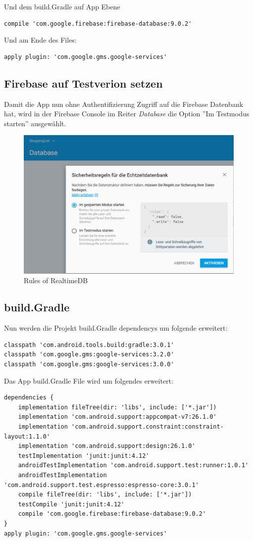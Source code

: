 Und dem build.Gradle auf App Ebene
\begin{lstlisting}
compile 'com.google.firebase:firebase-database:9.0.2'
\end{lstlisting}

Und am Ende des Files:
\begin{lstlisting}
apply plugin: 'com.google.gms.google-services'
\end{lstlisting}
\clearpage
\subsection{Firebase auf Testverion setzen}
Damit die App nun ohne Authentifizierung Zugriff auf die Firebase Datenbank hat, wird in der Firebase Console im Reiter \textit{Database} die Option ''Im Testmodus starten'' ausgewählt. 

\begin{figure}[!h]
	\centering
	\includegraphics[width=0.7\linewidth]{images/RealtimeDBrules}
	\caption{Rules of RealtimeDB}
	\label{fig:realtimedbrules}
\end{figure}

\subsection{build.Gradle}
Nun werden die Projekt build.Gradle dependencys um folgende erweitert:
\begin{lstlisting}
classpath 'com.android.tools.build:gradle:3.0.1'
classpath 'com.google.gms:google-services:3.2.0'
classpath 'com.google.gms:google-services:3.0.0'
\end{lstlisting}

Das App build.Gradle File wird um folgendes erweitert:
\begin{lstlisting}
dependencies {
	implementation fileTree(dir: 'libs', include: ['*.jar'])
	implementation 'com.android.support:appcompat-v7:26.1.0'
	implementation 'com.android.support.constraint:constraint-layout:1.1.0'
	implementation 'com.android.support:design:26.1.0'
	testImplementation 'junit:junit:4.12'
	androidTestImplementation 'com.android.support.test:runner:1.0.1'
	androidTestImplementation 'com.android.support.test.espresso:espresso-core:3.0.1'
	compile fileTree(dir: 'libs', include: ['*.jar'])
	testCompile 'junit:junit:4.12'
	compile 'com.google.firebase:firebase-database:9.0.2'
}
apply plugin: 'com.google.gms.google-services'
\end{lstlisting}

